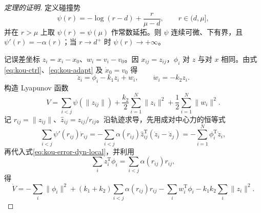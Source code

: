 \begin{proof}[定理的证明]
定义碰撞势
\begin{equation}
\psi(r)=-\log(r-d)+\frac{r}{\mu-d},\qquad r\in(d,\mu],
\label{eq:kou-psi}
\end{equation}
并在 $r>\mu$ 上取 $\psi(r)=\psi(\mu)$ 作常数延拓。则 $\psi$ 连续可微、下有界，且 $\psi'(r)=-\alpha(r)$；当 $r\to d^+$ 时 $\psi(r)\to+\infty$。

记误差坐标 $z_i=x_i-x_0$、$w_i=v_i-v_0$。因 $x_{ij}=z_{ij}$，$\phi_i$ 对 $z$ 与对 $x$ 相同。由式\eqref{eq:kou-ctrl}、\eqref{eq:kou-adapt} 及 $\dot{x}_0=v_0$ 得
\begin{equation}
\dot{z}_i=\phi_i-k_1z_i+w_i,\qquad \dot{w}_i=-k_2z_i.
\label{eq:kou-error-dyn-local}
\end{equation}
构造 Lyapunov 函数
\begin{equation}
V=\sum_{i<j}\psi(\|z_{ij}\|)+\frac{k_2}{2}\sum_{i=1}^{N}\|z_i\|^2+\frac{1}{2}\sum_{i=1}^{N}\|w_i\|^2.
\label{eq:kou-lyap}
\end{equation}
记 $r_{ij}=\|z_{ij}\|$、$\hat{z}_{ij}=z_{ij}/r_{ij}$。沿轨迹求导，先用成对中心力的恒等式
\begin{equation}
\sum_{i<j}\psi'(r_{ij})\dot{r}_{ij}
=-\sum_{i<j}\alpha(r_{ij})\hat{z}_{ij}^{\mathrm{T}}(\dot{z}_i-\dot{z}_j)
=-\sum_{i=1}^{N}\phi_i^{\mathrm{T}}\dot{z}_i,
\end{equation}
再代入式\eqref{eq:kou-error-dyn-local}，并利用
\begin{equation}
\sum_i z_i^{\mathrm{T}}\phi_i=\sum_{i<j}\alpha(r_{ij})r_{ij},
\end{equation}
得
\begin{equation}
\dot{V}
=-\sum_i\|\phi_i\|^2
+(k_1+k_2)\sum_{i<j}\alpha(r_{ij})r_{ij}
-\sum_i w_i^{\mathrm{T}}\phi_i
-k_1k_2\sum_i\|z_i\|^2.
\label{eq:kou-dotv}
\end{equation}


\end{proof}
